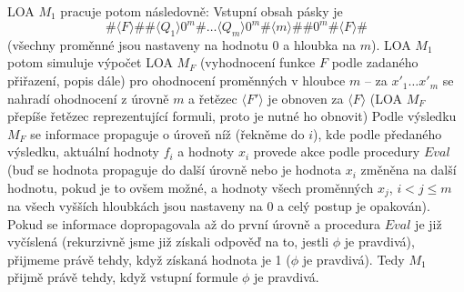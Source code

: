 \documentclass[a4paper,12pt]{article}
\begin{document}
\begin{enumerate}[label=\textbf{\arabic*}.]
  LOA $M_1$ pracuje potom následovně: Vstupní obsah pásky je 
  \begin{equation}
    \#\langle F\rangle\#\#\langle Q_1\rangle 0^m\#\dots \langle Q_m\rangle 0^m\#\langle m\rangle\#\#0^m\#\langle F\rangle\#
  \end{equation}
  (všechny 
  proměnné jsou nastaveny na hodnotu 0 a hloubka na $m$). LOA $M_1$ potom simuluje výpočet LOA $M_F$ (vyhodnocení funkce $F$ podle 
  zadaného přiřazení, popis dále)
  pro ohodnocení proměnných v hloubce $m$ -- za $x'_1\dots x'_m$ se nahradí ohodnocení z úrovně $m$ a 
  řetězec $\langle F'\rangle$ je obnoven za $\langle F\rangle$ (LOA $M_F$ přepíše řetězec reprezentující formuli, proto je nutné ho obnovit)
  Podle výsledku $M_F$ se informace propaguje o úroveň níž (řekněme do $i$), kde podle předaného výsledku,
  aktuální hodnoty $f_i$ a hodnoty $x_i$ provede akce podle procedury $Eval$ (buď se hodnota propaguje do další úrovně nebo je
  hodnota $x_i$ změněna na další hodnotu, pokud je to ovšem možné, a hodnoty všech proměnných $x_j$, $i < j \leq m$ na všech 
  vyšších hloubkách jsou nastaveny na 0 a celý postup je opakován). Pokud se informace dopropagovala až do první úrovně
  a procedura $Eval$ je již vyčíslená (rekurzivně jsme již získali odpověď na to, jestli $\phi$ je pravdivá), přijmeme 
  právě tehdy, když získaná hodnota je 1 ($\phi$ je pravdivá). Tedy $M_1$ přijmě právě tehdy, když vstupní formule $\phi$ je pravdivá.
  
  
  
  
  

\end{enumerate}
\end{document}
